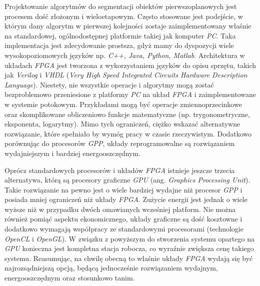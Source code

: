 Projektowanie algorytmów do segmentacji obiektów pierwszoplanowych jest procesem dość złożonym i wieloetapowym. Często stosowane jest podejście, w którym dany algorytm w pierwszej kolejności zostaje zaimplementowany właśnie na standardowej, ogólnodostępnej platformie takiej jak komputer \textit{PC}. 
Taka implementacja jest zdecydowanie prostsza, gdyż mamy do dyspozycji wiele wysokopoziomowych języków np. \textit{C++, Java, Python, Matlab}. 
Architektura w układach \textit{FPGA} jest tworzona z wykorzystaniem języków do opisu sprzętu, takich jak \textit{Verilog} i \textit{VHDL} (\textit{Very High Speed Integrated Circuits Hardware Description Language}). 
Niestety, nie wszystkie operacje i algorytmy mogą zostać bezproblemowo przeniesione z platformy \textit{PC} na układ \textit{FPGA} i zaimplementowane w systemie potokowym. 
Przykładami mogą być operacje zmiennoprzecinkowe oraz skomplikowane obliczeniowo funkcje matematyczne (np. trygonometryczne, eksponenta, logarytmy). 
Mimo tych ograniczeń, ciężko wskazać alternatywne rozwiązanie, które spełniało by wymóg pracy w czasie rzeczywistym. 
Dodatkowo porównując do procesorów \textit{GPP}, układy reprogramowalne są rozwiązaniem wydajniejszym i bardziej energooszczędnym.

Oprócz standardowych procesorów i układów \textit{FPGA} istnieje jeszcze trzecia alternatywa, którą są procesory graficzne \textit{GPU} (ang. \textit{Graphics Processing Unit}). Takie rozwiązanie na pewno jest o wiele bardziej wydajne niż procesor \textit{GPP} i posiada mniej ograniczeń niż układy \textit{FPGA}. Zużycie energii jest jednak o wiele wyższe niż w przypadku dwóch omawianych wcześniej platform. Nie można również pomiąć aspektu ekonomicznego, układy graficzne są dość kosztowne i dodatkowo wymagają współpracy ze standardowymi procesorami (technologie \textit{OpenCL} i \textit{OpenGL}). W związku z powyższym do stworzenia systemu opartego na \textit{GPU} konieczna jest kompletna stacja robocza, co wyraźnie zwiększa cenę takiego systemu. Reasumując, na chwilę obecną to właśnie układy \textit{FPGA} wydają się być najrozsądniejszą opcją, będącą jednocześnie rozwiązaniem wydajnym, energooszczędnym oraz stosunkowo tanim. 


